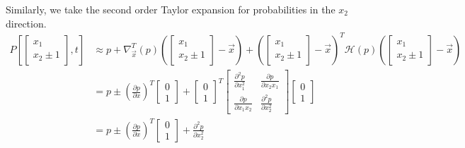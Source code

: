 Similarly, we take the second order Taylor expansion for probabilities in the $x_2$ direction.
\begin{align*}
    P\left[\begin{bmatrix} x_1\\x_2\pm1 \end{bmatrix}, t\right] &\approx 
    p + 
    \nabla^T_{\vec{x}}(p) \left(\begin{bmatrix} x_1\\x_2\pm1 \end{bmatrix} - \vec{x}\right) + \left(\begin{bmatrix} x_1\\x_2\pm1 \end{bmatrix} - \vec{x}\right)^T \mathcal{H}(p)  \left(\begin{bmatrix} x_1\\x_2\pm1 \end{bmatrix} - \vec{x}\right) \\
    &= p \pm \left(\frac{\partial p}{\partial x}\right)^T \begin{bmatrix} 0\\1 \end{bmatrix} + \begin{bmatrix} 0\\1 \end{bmatrix}^T \begin{bmatrix}
        \frac{\partial^2 p}{\partial x_1^2} & \frac{\partial p}{\partial x_2 x_1} \\
        \frac{\partial p}{\partial x_1 x_2} & \frac{\partial^2 p}{\partial x_2^2}
    \end{bmatrix} \begin{bmatrix} 0\\1 \end{bmatrix} \\
    &= p \pm \left(\frac{\partial p}{\partial x}\right)^T \begin{bmatrix} 0\\1 \end{bmatrix} + \frac{\partial^2 p}{\partial x_2^2}
\end{align*}

